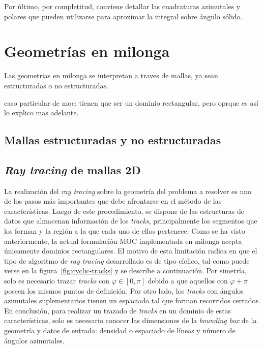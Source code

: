 \documentclass[11pt]{article}
\numberwithin{equation}{section}
\begin{document}
Por \'ultimo, por completitud, conviene detallar las cuadraturas azimutales y polares que pueden utilizarse para aproximar la integral sobre \'angulo s\'olido. 

\section{Geometr\'ias en milonga}

Las geometrias en milonga se interpretan a traves de mallas, ya sean estructuradas o no estructuradas. 

caso particular de moc: tienen que ser un dominio rectangular, pero oprque es así lo explico mas adelante.

\subsection{Mallas estructuradas y no estructuradas}

\subsection{\emph{Ray tracing} de mallas 2D}

La realizaci\'on del \emph{ray tracing} sobre la geometría del problema a resolver es uno de los pasos más importantes que debe afrontarse en el método de las características. Luego de este procedimiento, se dispone de las estructuras de datos que almacenan información de los \emph{tracks}, principalmente los segmentos que los forman y la región a la que cada uno de ellos pertenece. Como se ha visto anteriormente, la actual formulación MOC implementada en milonga acepta únicamente dominios rectangulares. El motivo de esta limitación radica en que el tipo de algoritmo de \emph{ray tracing} desarrollado es de tipo c\'iclico, tal como puede verse en la figura~\ref{fig:cyclic-tracks} y se describe a continuación. Por simetr\'ia, solo es necesario trazar \emph{tracks} con $\varphi \in \left[ 0, \pi \right]$ debido a que aquellos con $\varphi + \pi$ poseen los mismos puntos de definición. Por otro lado, los \emph{tracks} con ángulos azimutales suplementarios tienen un espaciado tal que forman recorridos cerrados. En conclusión, para realizar un trazado de \emph{tracks} en un dominio de estas características, solo es necesario conocer las dimensiones de la \emph{bounding box} de la geometría y datos de entrada: densidad o espaciado de líneas y número de ángulos azimutales.
\end{document}
